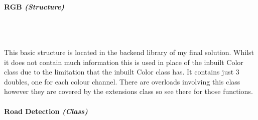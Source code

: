 \begin{FlushLeft}
    \bk

    \pagebreak
\paragraph{RGB \textit{(Structure)}} \mbox{} \\

    \begin{figure}[H]
        \centering
    \end{figure}\\

    This basic structure is located in the backend library of my final solution. Whilst it does not contain much information this is used in place of the inbuilt Color class due to the limitation that the inbuilt Color class has. It contains just 3 doubles, one for each colour channel. There are overloads involving this class however they are covered by the extensions class so see there for those functions.\\
    \bk

    \pagebreak
\paragraph{Road Detection \textit{(Class)}} \mbox{} \\

    \begin{figure}[H]
        \centering
    \end{figure}\\


\end{FlushLeft}

